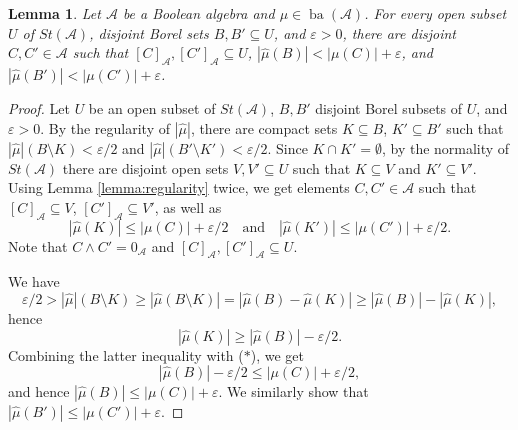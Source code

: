 \documentclass[a4paper,11pt,fleqn]{amsart}
\newtheorem{lemma}[theorem]{Lemma}
\theoremstyle{definition}
\theoremstyle{remark}
\numberwithin{equation}{section}
\newcommand{\eps}{\varepsilon}
\newcommand{\aA}{\mathcal{A}}
\DeclareMathOperator{\ba}{ba}
\newcommand{\sm}{\setminus}
\newcommand{\sub}{\subseteq}
\newcommand{\wh}{\widehat}
\newcommand{\clopen}[1]{\left[#1\right]}
\begin{document}
\begin{lemma}\label{lemma:regularity2}
    Let $\aA$ be a Boolean algebra and $\mu\in\ba(\aA)$. For every open subset $U$ of $St(\aA)$, disjoint Borel sets $B,B'\sub U$, and $\eps>0$, there are disjoint $C,C'\in\aA$ such that $\clopen{C}_\aA,\clopen{C'}_\aA\sub U$, $|\wh{\mu}(B)|<|\mu(C)|+\eps$, and $|\wh{\mu}(B')|<|\mu(C')|+\eps$.
\end{lemma}
\begin{proof}
    Let $U$ be an open subset of $St(\aA)$, $B,B'$ disjoint Borel subsets of $U$, and $\eps>0$. By the regularity of $|\wh{\mu}|$, there are compact sets $K\sub B$, $K'\sub B'$ such that $|\wh{\mu}|(B\sm K)<\eps/2$ and $|\wh{\mu}|(B'\sm K')<\eps/2$. Since $K\cap K'=\emptyset$, by the normality of $St(\aA)$ there are disjoint open sets $V,V'\sub U$ such that $K\sub V$ and $K'\sub V'$. Using Lemma \ref{lemma:regularity} twice, we get elements $C,C'\in\aA$ such that $\clopen{C}_\aA\sub V$, $\clopen{C'}_\aA\sub V'$, as well as
    \[\tag{$*$}|\wh{\mu}(K)|\le|\mu(C)|+\eps/2\quad\text{and}\quad|\wh{\mu}(K')|\le|\mu(C')|+\eps/2.\]
    Note that $C\wedge C'=0_\aA$ and $\clopen{C}_\aA,\clopen{C'}_\aA\sub U$.    

    We have
    \[\eps/2>|\wh{\mu}|(B\sm K)\ge|\wh{\mu}(B\sm K)|=|\wh{\mu}(B)-\wh{\mu}(K)|\ge|\wh{\mu}(B)|-|\wh{\mu}(K)|,\]
    hence
    \[|\wh{\mu}(K)|\ge|\wh{\mu}(B)|-\eps/2.\]
    Combining the latter inequality with ($*$), we get
    \[|\wh{\mu}(B)|-\eps/2\le|\mu(C)|+\eps/2,\]
    and hence $|\wh{\mu}(B)|\le|\mu(C)|+\eps$. We similarly show that $|\wh{\mu}(B')|\le|\mu(C')|+\eps$.
\end{proof}
\end{document}
